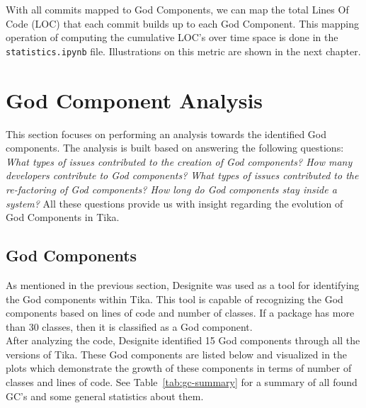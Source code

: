 \documentclass{article}
\begin{document}
With all commits mapped to God Components, we can map the total Lines Of Code (LOC) that each commit builds up to each God Component. This mapping operation of computing the cumulative LOC's over time space is done in the \texttt{statistics.ipynb} file. Illustrations on this metric are shown in the next chapter.

\section{God Component Analysis}
This section focuses on performing an analysis towards the identified God components. The analysis is built based on answering the following questions: \textit{What types of issues contributed to the creation of God components? How many developers contribute to God components? What types of issues contributed to the re-factoring of God components? How long do God components stay inside a system?} All these questions provide us with insight regarding the evolution of God Components in Tika.

\subsection{God Components}
As mentioned in the previous section, Designite was used as a tool for identifying the God components within Tika. This tool is capable of recognizing the God components based on lines of code and number of classes. If a package has more than 30 classes, then it is classified as a God component.\\
After analyzing the code, Designite identified 15 God components through all the versions of Tika. These God components are listed below and visualized in the plots which demonstrate the growth of these components in terms of number of classes and lines of code. See Table~\ref{tab:gc-summary} for a summary of all found GC's and some general statistics about them.
\end{document}

